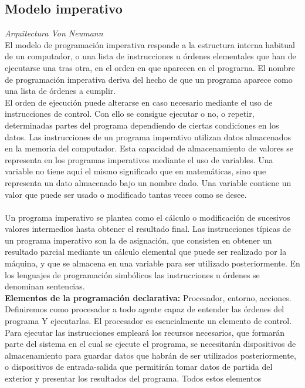 \documentclass[11pt,a4paper]{article}
\begin{document}
	\subsection{Modelo imperativo}
	\textit{Arquitectura Von Neumann}\\
	El modelo de programación imperativa responde a la estructura interna habitual de un computador, o una lista de instrucciones u
	órdenes elementales que han de ejecutarse una tras otra, en el orden en que aparecen en el prograrna. El nombre de programación imperativa deriva del hecho de que un programa aparece como una lista de órdenes a cumplir. \\
	El orden de ejecución puede alterarse en caso necesario mediante el uso de instrucciones de control. Con ello se consigue ejecutar o no, o repetir, determinadas partes del programa dependiendo de ciertas condiciones en los datos.
	Las instrucciones de un programa imperativo utilizan datos almacenados en la memoria del computador. Esta capacidad de almacenamiento de valores se representa en los programas imperativos mediante el uso de variables. Una variable no tiene aquí el mismo significado que en matemáticas, sino que representa un dato almacenado bajo un nombre dado. Una variable contiene un valor que puede ser usado o modificado tantas veces como se desee. \\
	\\
	Un programa imperativo se plantea como el cálculo o modificación de sucesivos valores intermedios hasta obtener el resultado final. Las instrucciones típicas de un programa imperativo son la de asignación, que consisten en obtener un
	resultado parcial mediante un cálculo elemental que puede ser realizado por la máquina, y que se almacena en una variable para ser utilizado posteriormente.
	En los lenguajes de programación simbólicos las instrucciones u órdenes se denominan sentencias.\\
	\textbf{Elementos de la programación declarativa:} Procesador, entorno, acciones.\\
	Definiremos como procesador a todo agente capaz de entender las órdenes
	del programa Y ejecutarlas.
	El procesador es esencialmente un elemento de control. Para ejecutar las instrucciones empleará los recursos necesarios, que formarán parte del sistema en el cual se ejecute el programa,
	se necesitarán dispositivos de
	almacenamiento para guardar datos que habrán de ser utilizados posteriormente, o dispositivos de entrada-salida que permitirán tomar datos de partida
	del exterior y presentar los resultados del programa. Todos estos elementos
\end{document}
